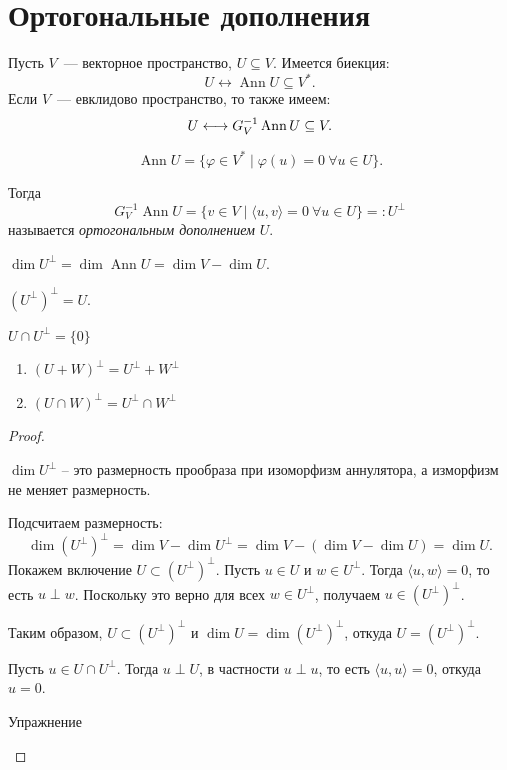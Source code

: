 \section{Ортогональные дополнения}
\begin{definition}
    Пусть $V$~--- векторное пространство, $U\subseteq V$. Имеется биекция:
    \[
        U \longleftrightarrow \operatorname{Ann} U \subseteq V^*.
    \]
    Если $V$~--- евклидово пространство, то также имеем:
    \[
        U \longleftrightarrow G_V^{-1}\operatorname{Ann} U \subseteq V.\\
    \]

    \[
    \operatorname{Ann} U = \{\varphi \in V^* \mid \varphi(u) = 0 \ \forall u \in U\}. 
    \]

    Тогда
    \[
        G_V^{-1}\operatorname{Ann} U
        = \{v \in V \mid \langle u, v\rangle = 0 \ \forall u \in U\}
        =: U^\perp
    \]
    называется \emph{ортогональным дополнением} $U$.
\end{definition}

\begin{proplist}
    \item $\dim U^\perp = \dim \operatorname{Ann} U = \dim V - \dim U$.
    \item $(U^\perp)^\perp = U$.
    \item $U \cap U^\perp = \{0\}$
    \item  
    \begin{enumerate}
        \item $(U + W)^\perp = U^\perp + W^\perp$
        \item $(U \cap W)^\perp = U^\perp \cap W^\perp$
    \end{enumerate}
    \begin{proof}
    \begin{proofsteps}
        \item
        $\dim U^\perp$ -- это размерность прообраза при изоморфизм аннулятора, а изморфизм не меняет размерность. 
        \item
        Подсчитаем размерность:
		\[
			\dim(U^\perp)^\perp
			= \dim V - \dim U^\perp
			= \dim V - (\dim V - \dim U)
			= \dim U.
		\]
		Покажем включение $U \subset (U^\perp)^\perp$. Пусть $u \in U$ и $w \in U^\perp$. Тогда $\langle u, w\rangle = 0$, то есть $u \perp w$. Поскольку это верно для всех $w \in U^\perp$, получаем $u \in (U^\perp)^\perp$.
 
		Таким образом, $U \subset (U^\perp)^\perp$ и $\dim U = \dim(U^\perp)^\perp$, откуда $U = (U^\perp)^\perp$.
        \item
        Пусть $u \in U \cap U^\perp$. Тогда $u \perp U$, в частности $u \perp u$, то есть $\langle u, u\rangle = 0$, откуда $u = 0$.
        \item Упражнение
        
    \end{proofsteps}
    \end{proof}

\end{proplist}


